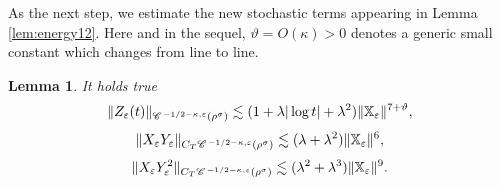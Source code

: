 \documentclass[a4paper,11pt]{article}
\newtheorem{lemma}[theorem]{Lemma}
\numberwithin{equation}{section}
\newcommand{\CC}{\mathscr{C} \hspace{.1em}}
\begin{document}
As the next step, we estimate the new stochastic terms appearing in Lemma
\ref{lem:energy12}. Here and in the sequel, $\vartheta=O(\kappa)>0$ denotes a generic small constant which changes from line to line.

\begin{lemma}
  \label{lem:Z}
It holds true
  \[ \| Z_{\varepsilon} (t) \|_{\CC^{- 1 / 2 - \kappa, \varepsilon}
     (\rho^{\sigma})} \lesssim (1+\lambda |\log t| +\lambda^2)  \|     \mathbb{X}_{\varepsilon}\|^{7+\vartheta}, \]
  \[ \| X_{\varepsilon} Y_{\varepsilon} \|_{C_T \CC^{- 1 / 2 - \kappa,
     \varepsilon} (\rho^{\sigma})}  \lesssim (\lambda+\lambda^2)
    \|     \mathbb{X}_{\varepsilon}\|^{6}, \]
     \[ \| X_{\varepsilon} Y_{\varepsilon}^2
     \|_{C_T \CC^{- 1 / 2 - \kappa, \varepsilon} (\rho^{\sigma})} \lesssim (\lambda^{2}+\lambda^3)
     \|     \mathbb{X}_{\varepsilon}\|^{9}. \]
\end{lemma}
\end{document}
